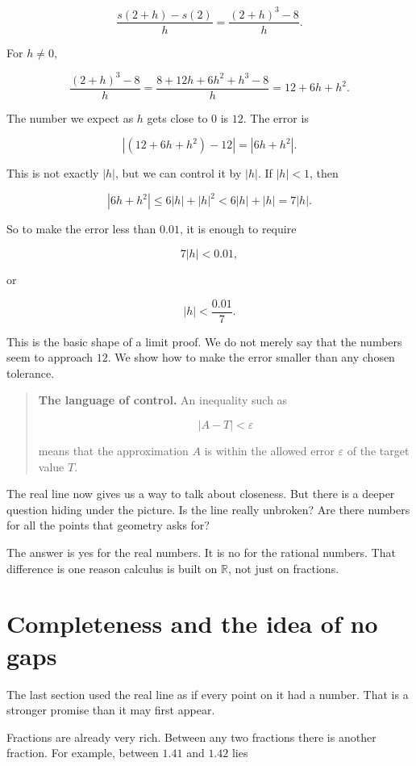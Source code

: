 \[
\frac{s(2+h)-s(2)}{h}
=
\frac{(2+h)^3-8}{h}.
\]

For \(h\neq 0\),

\[
\frac{(2+h)^3-8}{h}
=
\frac{8+12h+6h^2+h^3-8}{h}
=
12+6h+h^2.
\]

The number we expect as \(h\) gets close to \(0\) is \(12\). The error is

\[
|(12+6h+h^2)-12|
=
|6h+h^2|.
\]

This is not exactly \(|h|\), but we can control it by \(|h|\). If \(|h|<1\), then

\[
|6h+h^2|
\le 6|h|+|h|^2
<6|h|+|h|
=
7|h|.
\]

So to make the error less than \(0.01\), it is enough to require

\[
7|h|<0.01,
\]

or

\[
|h|<\frac{0.01}{7}.
\]

This is the basic shape of a limit proof. We do not merely say that the numbers seem to approach \(12\). We show how to make the error smaller than any chosen tolerance.

\begin{quote}
\textbf{The language of control.}
An inequality such as

\[
|A-T|<\varepsilon
\]

means that the approximation \(A\) is within the allowed error \(\varepsilon\) of the target value \(T\).
\end{quote}

The real line now gives us a way to talk about closeness. But there is a deeper question hiding under the picture. Is the line really unbroken? Are there numbers for all the points that geometry asks for?

The answer is yes for the real numbers. It is no for the rational numbers. That difference is one reason calculus is built on \(\mathbb R\), not just on fractions.

\section{Completeness and the idea of no gaps}
\label{sec:completeness-no-gaps}

The last section used the real line as if every point on it had a number. That is a stronger promise than it may first appear.

Fractions are already very rich. Between any two fractions there is another fraction. For example, between \(1.41\) and \(1.42\) lies

